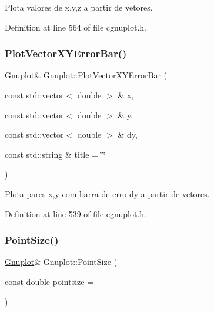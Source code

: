 Plota valores de x,y,z a partir de vetores. 



Definition at line 564 of file cgnuplot.\+h.

\mbox{\label{class_gnuplot_a6d3863c1b14d93c14b50df0a11dfdbd8}} 
\subsubsection{\texorpdfstring{Plot\+Vector\+X\+Y\+Error\+Bar()}{PlotVectorXYErrorBar()}}
{\footnotesize\ttfamily \hyperlink{class_gnuplot}{Gnuplot}\& Gnuplot\+::\+Plot\+Vector\+X\+Y\+Error\+Bar (\begin{DoxyParamCaption}\item[{const std\+::vector$<$ double $>$ \&}]{x,  }\item[{const std\+::vector$<$ double $>$ \&}]{y,  }\item[{const std\+::vector$<$ double $>$ \&}]{dy,  }\item[{const std\+::string \&}]{title = {\ttfamily \char`\"{}\char`\"{}} }\end{DoxyParamCaption})\hspace{0.3cm}{\ttfamily [inline]}}



Plota pares x,y com barra de erro dy a partir de vetores. 



Definition at line 539 of file cgnuplot.\+h.

\mbox{\label{class_gnuplot_adb4a794cf81d9b615f133feca1e917e8}} 
\subsubsection{\texorpdfstring{Point\+Size()}{PointSize()}}
{\footnotesize\ttfamily \hyperlink{class_gnuplot}{Gnuplot}\& Gnuplot\+::\+Point\+Size (\begin{DoxyParamCaption}\item[{const double}]{pointsize = {} }\end{DoxyParamCaption})\hspace{0.3cm}{\ttfamily [inline]}}



